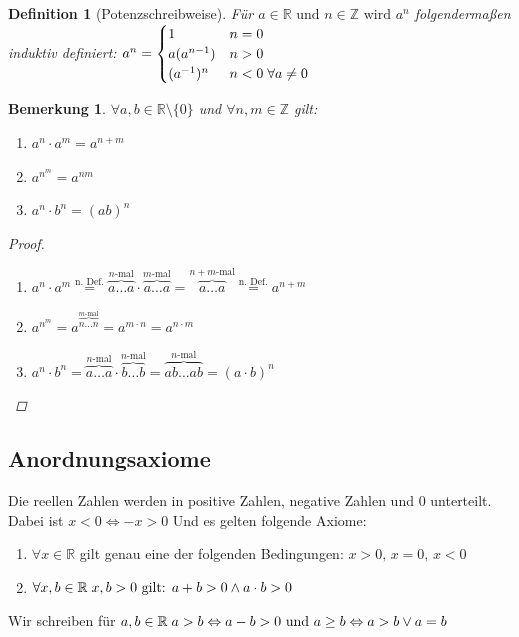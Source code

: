 \documentclass[a4paper,titlepage,oneside]{article}
\def\Z{\ensuremath{\mathbb{Z}} }
\def\R{\ensuremath{\mathbb{R}} }
\def\fa{\ensuremath{\forall}}
\def\lor{\ensuremath{\vee}}
\def\land{\ensuremath{\wedge}}
\def\sp{\hspace{0,1cm}}
\theoremstyle{thmstyle}
\theoremstyle{subthmstyle}
\newtheorem{subdefi}[subsatz]{Definition}
\newtheorem{subbem}[subsatz]{Bemerkung}
\begin{document}
\begin{subdefi}[Potenzschreibweise]
Für \(a \in \R \text{ und }n \in \Z \text{ wird }a^n\) folgendermaßen induktiv definiert:
$a^n = \begin{cases} 1 			& n = 0\\
				a(a^{n-1}) 	& n > 0\\
				(a^{-1})^n 	& n < 0 \sp \forall a \ne 0 \end{cases}$
\end{subdefi}

\begin{subbem}
\(\fa a, b \in \R \setminus \{0\} \) und \( \fa n, m \in \Z\) gilt:
\begin{multicols}{3}
\begin{enumerate}[label=(\arabic*)]
	\item $\displaystyle a^n \cdot a^m = a^{n+m} $
	\item $\displaystyle a^{n^m} = a^{nm} $
	\item $\displaystyle a^n \cdot b^n = (ab)^n $
\end{enumerate}
\end{multicols}
\begin{proof}\sp
\begin{enumerate}[label=(\arabic*)]
	\item $\displaystyle a^n \cdot a^m \overset{\text{n. Def.}}{=} \overbrace{a \dots a}^{n\text{-mal}} \cdot \overbrace{a \dots a}^{m\text{-mal}} = \overbrace{a \dots a}^{n+m\text{-mal}} \overset{\text{n. Def.}}{=} a^{n+m}$
	\item $\displaystyle a^{n^m} = a^{\overbrace{n \dots n}^{m\text{-mal}}} = a^{m \cdot n} = a^{n\cdot m}$
	\item $\displaystyle a^n \cdot b^n = \overbrace{a \dots a}^{n\text{-mal}}\cdot\overbrace{b \dots b}^{n\text{-mal}} = \overbrace{ab \dots ab}^{n\text{-mal}} = (a \cdot b)^{n}$
\end{enumerate}
\end{proof}
\end{subbem}

\subsection{Anordnungsaxiome}
Die reellen Zahlen werden in positive Zahlen, negative Zahlen und 0 unterteilt. Dabei ist \(x < 0 \Leftrightarrow -x > 0\) Und es gelten folgende Axiome:
\begin{enumerate}[label=(\arabic*)]
	\item \(\fa x \in \R \) gilt genau eine der folgenden Bedingungen: \(x > 0\text{, } x = 0\text{, } x < 0 \)
	\item \(\fa x,b \in \R \sp x,b > 0 \text{ gilt: } a + b > 0 \land a \cdot b > 0\)
\end{enumerate}
Wir schreiben für \(a, b \in \R \sp a > b \Leftrightarrow a - b > 0\text{ und }a \ge b \Leftrightarrow a > b \lor a = b \)
\end{document}
